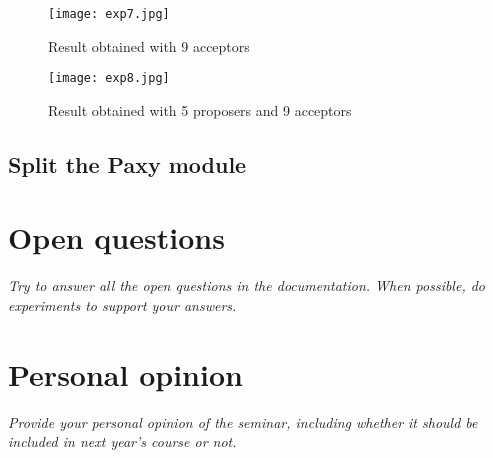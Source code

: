 \documentclass[a4paper, 11pt]{article}
\begin{document}
\begin{figure}[h!]
\begin{center}
\hspace*{-1in}
\texttt{[image: exp7.jpg]}
\caption{Result obtained with 9 acceptors}
\end{center}
\end{figure}
 
\begin{figure}[h!]
\begin{center}
\hspace*{-1in}
\texttt{[image: exp8.jpg]}
\caption{Result obtained with 5 proposers and 9 acceptors}
\end{center}
\end{figure}

\subsection{Split the Paxy module}

\section{Open questions}

\textit{Try to answer all the open questions in the documentation. When possible, do experiments to support your answers.}

\section{Personal opinion}

\textit{Provide your personal opinion of the seminar, including whether it should be included in next year's course or not.}
\end{document}
